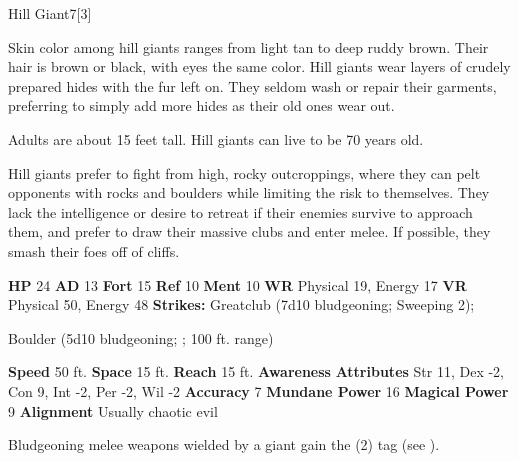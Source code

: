       
  \begin{monsubsection}{Hill Giant}{7}[3]
    \vspace{-1em}\vspace{-1em}
    \vspace{0em}

    
        Skin color among hill giants ranges from light tan to deep ruddy brown. Their hair is brown or black, with eyes the same color. Hill giants wear layers of crudely prepared hides with the fur left on. They seldom wash or repair their garments, preferring to simply add more hides as their old ones wear out.

        Adults are about 15 feet tall. Hill giants can live to be 70 years old.
      
        Hill giants prefer to fight from high, rocky outcroppings, where they can pelt opponents with rocks and boulders while limiting the risk to themselves.
        They lack the intelligence or desire to retreat if their enemies survive to approach them, and prefer to draw their massive clubs and enter melee.
        If possible, they smash their foes off of cliffs.
      

    \begin{spellcontent}
      \begin{spelltargetinginfo}
        \pari \textbf{HP} 24 \monsep
          \textbf{AD} 13 \monsep
          \textbf{Fort} 15 \monsep
          \textbf{Ref} 10 \monsep
          \textbf{Ment} 10
        \pari \textbf{WR} Physical 19, Energy 17 \monsep
        \textbf{VR} Physical 50, Energy 48
        \pari \textbf{Strikes:}
            Greatclub  (7d10 bludgeoning; Sweeping 2);
\par Boulder  (5d10 bludgeoning; ; 100 ft. range)
      \end{spelltargetinginfo}
    \end{spellcontent}
    \begin{monsterfooter}
      \pari \textbf{Speed} 50 ft. \monsep
        \textbf{Space} 15 ft. \monsep
        \textbf{Reach} 15 ft.
      \pari \textbf{Awareness} 
      \pari \textbf{Attributes}
        Str 11, Dex -2,
        Con 9, Int -2,
        Per -2, Wil -2
      \pari \textbf{Accuracy} 7 \monsep
        \textbf{Mundane Power} 16 \monsep
      \textbf{Magical Power} 9
      \pari \textbf{Alignment} Usually chaotic evil
    \end{monsterfooter}
  \end{monsubsection}
        Bludgeoning melee weapons wielded by a giant gain the  (2) tag (see ).
      
